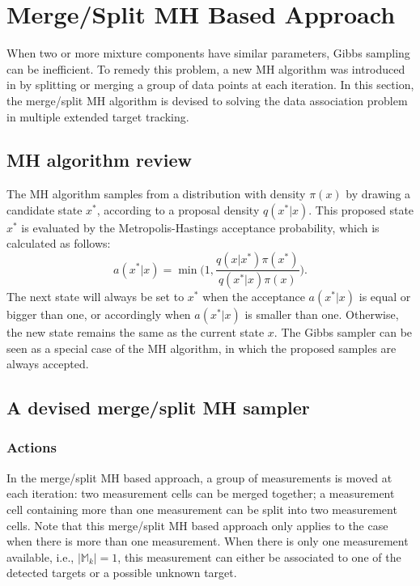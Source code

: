 \section{Merge/Split MH Based Approach}
When two or more mixture components have similar parameters, Gibbs sampling can be inefficient. To remedy this problem, a new MH algorithm was introduced in \cite{mergesplit} by splitting or merging a group of data points at each iteration. In this section, the merge/split MH algorithm is devised to solving the data association problem in multiple extended target tracking. 

\subsection{MH algorithm review}
The MH algorithm samples from a distribution with density $\pi(x)$ by drawing a candidate state $x^*$, according to a proposal density $q(x^*|x)$. This proposed state $x^*$ is evaluated by the Metropolis-Hastings acceptance probability, which is calculated as follows:
\begin{equation}
    a(x^*|x) = \min\bigg(1,\frac{q(x|x^*)\pi(x^*)}{q(x^*|x)\pi(x)}\bigg).
    \label{eq:mhprob}
\end{equation}
The next state will always be set to $x^*$ when the acceptance $a(x^*|x)$ is equal or bigger than one, or accordingly when $a(x^*|x)$ is smaller than one. Otherwise, the new state remains the same as the current state $x$. The Gibbs sampler can be seen as a special case of the MH algorithm, in which the proposed samples are always accepted. 

\subsection{A devised merge/split MH sampler}

\subsubsection{Actions}

In the merge/split MH based approach, a group of measurements is moved at each iteration: two measurement cells can be merged together; a measurement cell containing more than one measurement can be split into two measurement cells. Note that this merge/split MH based approach only applies to the case when there is more than one measurement. When there is only one measurement available, i.e., $|\mathbb{M}_k|=1$, this measurement can either be associated to one of the detected targets or a possible unknown target. 


